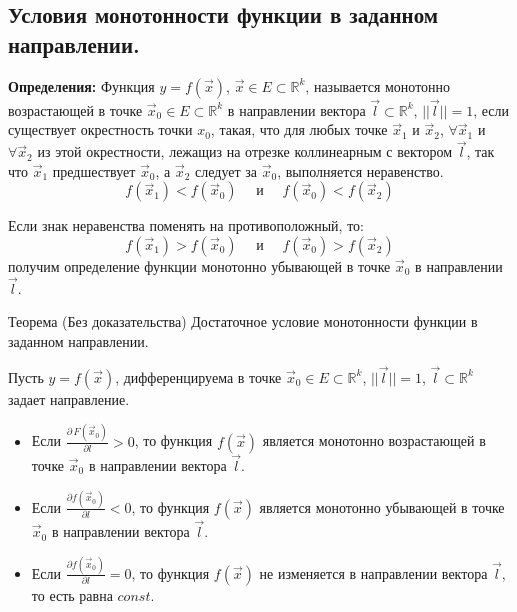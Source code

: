 \subsection{Условия монотонности функции в заданном направлении.}

\textbf{Определения: } Функция $y = f(\vec{x})$, $\vec{x} \in E \subset \mathbb{R}^k$, называется монотонно возрастающей в точке $\vec{x}_0 \in E \subset \mathbb{R}^k$ в направлении вектора $\vec{l} \subset \mathbb{R}^k$, $||\vec{l}|| = 1$, если существует окрестность точки $x_0$, такая, что для любых точке $\vec{x}_1$ и $\vec{x}_2$, $\forall \vec{x}_1$ и $\forall \vec{x}_2$ из этой окрестности, лежащиз на отрезке коллинеарным с вектором $\vec{l}$, так что $\vec{x}_1$ предшествует $\vec{x}_0$, а $\vec{x}_2$ следует за $\vec{x}_0$, выполняется неравенство.
\begin{equation} \label{eq:6.2}
	f(\vec{x}_1) < f(\vec{x}_0) \quad \text{ и } \quad f(\vec{x}_0) < f(\vec{x}_2)
\end{equation}

Если знак неравенства поменять на противоположный, то:
\begin{equation} \label{eq:6.3}
	f(\vec{x}_1) > f(\vec{x}_0) \quad \text{ и } \quad f(\vec{x}_0) > f(\vec{x}_2)
\end{equation}
получим определение функции монотонно убывающей в точке $\vec{x}_0$ в направлении $\vec{l}$.

\begin{tbox}{Теорема (Без доказательства)}
	Достаточное условие монотонности функции в заданном направлении.

	Пусть $y = f(\vec{x})$, дифференцируема в точке $\vec{x}_0 \in E \subset \mathbb{R}^k$,  $||\vec{l}|| = 1$, $\vec{l} \subset \mathbb{R}^k$ задает направление.

	\begin{itemize}
		\item Если $\displaystyle \frac{\partial \, F(\vec{x}_0)}{\partial l} > 0$, то функция $f(\vec{x})$ является монотонно возрастающей в точке $\vec{x}_0$ в направлении вектора $\vec{l}$.
		\item Если $\displaystyle\frac{\partial f(\vec{x}_0)}{\partial l} < 0$, то функция $f(\vec{x})$ является монотонно убывающей в точке $\vec{x}_0$ в направлении вектора $\vec{l}$.
		\item Если $\displaystyle\frac{\partial f(\vec{x}_0)}{\partial l} = 0$, то функция $f(\vec{x})$ не изменяется в направлении вектора $\vec{l}$, то есть равна $const$.
	\end{itemize}
\end{tbox}